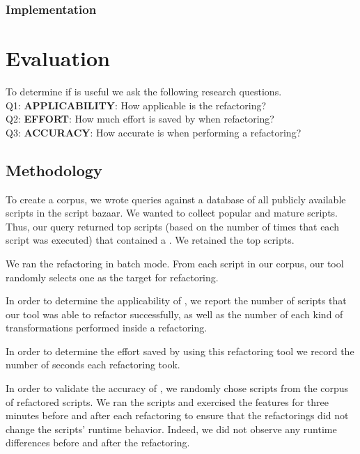\documentclass[preprint]{sigplanconf}
\begin{document}
\subsubsection{Implementation}


\section{Evaluation}
\label{sec:evaluation}
To determine if \tool is useful we ask the following research questions.\\
Q1:  \textbf{APPLICABILITY}:  How applicable is the refactoring?\\
Q2:  \textbf{EFFORT}: How much effort is saved by \tool when refactoring?\\
Q3:  \textbf{ACCURACY}: How accurate is \tool when performing a refactoring?\\
 
\subsection{Methodology}

To create a corpus, we wrote queries against a database of all publicly available scripts in the \TD script bazaar. We wanted to collect popular and mature scripts. 
Thus, our query returned top scripts (based on the number of times that each script was executed) 
that contained a \NC{}. We retained the top \numScripts scripts.

We ran the refactoring in batch mode. From each script in our corpus, our tool randomly selects one \NC{} as the target for refactoring. 

In order to determine the applicability of \tool, we report the number of scripts that our tool was able to refactor successfully, as well as the number of each kind of transformations performed inside a refactoring.

In order to determine the effort saved by using this refactoring tool we record the number of seconds each refactoring took. 

In order to validate the accuracy of \tool, we randomly chose \numManual scripts from the corpus of \numScripts refactored scripts. We ran the scripts and exercised the features for three minutes before and after each refactoring to ensure that the refactorings did not change the scripts' runtime behavior. Indeed, we did not observe any runtime differences before and after the refactoring. 
\end{document}
